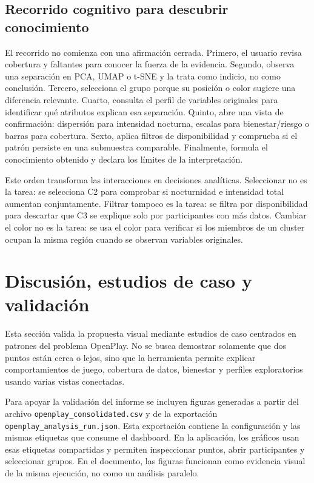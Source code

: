 \documentclass[12pt,a4paper]{article}
\begin{document}
\subsection{Recorrido cognitivo para descubrir conocimiento}

El recorrido no comienza con una afirmaci\'on cerrada. Primero, el usuario revisa cobertura y faltantes para conocer la fuerza de la evidencia. Segundo, observa una separaci\'on en PCA, UMAP o t-SNE y la trata como indicio, no como conclusi\'on. Tercero, selecciona el grupo porque su posici\'on o color sugiere una diferencia relevante. Cuarto, consulta el perfil de variables originales para identificar qu\'e atributos explican esa separaci\'on. Quinto, abre una vista de confirmaci\'on: dispersi\'on para intensidad nocturna, escalas para bienestar/riesgo o barras para cobertura. Sexto, aplica filtros de disponibilidad y comprueba si el patr\'on persiste en una submuestra comparable. Finalmente, formula el conocimiento obtenido y declara los l\'imites de la interpretaci\'on.

Este orden transforma las interacciones en decisiones anal\'iticas. Seleccionar no es la tarea: se selecciona C2 para comprobar si nocturnidad e intensidad total aumentan conjuntamente. Filtrar tampoco es la tarea: se filtra por disponibilidad para descartar que C3 se explique solo por participantes con m\'as datos. Cambiar el color no es la tarea: se usa el color para verificar si los miembros de un cluster ocupan la misma regi\'on cuando se observan variables originales.

\section{Discusi\'on, estudios de caso y validaci\'on}

Esta secci\'on valida la propuesta visual mediante estudios de caso centrados en patrones del problema OpenPlay. No se busca demostrar solamente que dos puntos est\'an cerca o lejos, sino que la herramienta permite explicar comportamientos de juego, cobertura de datos, bienestar y perfiles exploratorios usando varias vistas conectadas.

Para apoyar la validaci\'on del informe se incluyen figuras generadas a partir del archivo \texttt{openplay\_consolidated.csv} y de la exportaci\'on \texttt{openplay\_analysis\_run.json}. Esta exportaci\'on contiene la configuraci\'on y las mismas etiquetas que consume el dashboard. En la aplicaci\'on, los gr\'aficos usan esas etiquetas compartidas y permiten inspeccionar puntos, abrir participantes y seleccionar grupos. En el documento, las figuras funcionan como evidencia visual de la misma ejecuci\'on, no como un an\'alisis paralelo.
\end{document}
